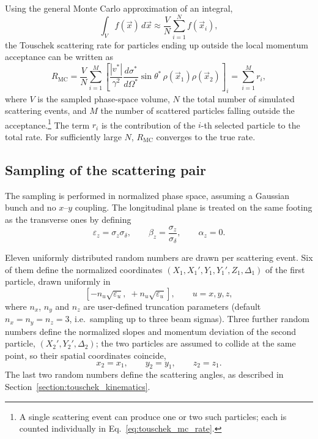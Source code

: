 Using the general Monte Carlo approximation of an integral,
\begin{equation}
    \int_V f(\vec{x})\, d\vec{x} \approx \frac{V}{N} \sum_{i=1}^{N} f(\vec{x}_i) ,
    \label{eq:touschek_mc_integral}
\end{equation}
the Touschek scattering rate for particles ending up outside the local momentum
acceptance can be written as
\begin{equation}
    R_{\mathrm{MC}} = \frac{V}{N} \sum_{i=1}^{M}
    \left[ \frac{|v^{*}|}{\gamma^{2}} \frac{d\sigma^{*}}{d\Omega^{*}}
    \sin\theta^{*}\, \rho(\vec{x}_1) \rho(\vec{x}_2) \right]_i
    = \sum_{i=1}^{M} r_i ,
    \label{eq:touschek_mc_rate}
\end{equation}
where $V$ is the sampled phase-space volume, $N$ the total number of simulated
scattering events, and $M$ the number of scattered particles falling outside the
acceptance.\footnote{A single scattering event can produce one or two such
particles; each is counted individually in Eq.~\eqref{eq:touschek_mc_rate}.} The
term $r_i$ is the contribution of the $i$-th selected particle to the total rate.
For sufficiently large $N$, $R_{\mathrm{MC}}$ converges to the true rate.

\subsection{Sampling of the scattering pair}
\label{section:touschek_sampling}

The sampling is performed in normalized phase space, assuming a Gaussian bunch
and no $x$--$y$ coupling. The longitudinal plane is treated on the same footing
as the transverse ones by defining
\begin{equation}
    \varepsilon_z = \sigma_z \sigma_\delta ,
    \qquad
    \beta_z = \frac{\sigma_z}{\sigma_\delta} ,
    \qquad
    \alpha_z = 0 .
    \label{eq:touschek_long_optics}
\end{equation}

Eleven uniformly distributed random numbers are drawn per scattering event.
Six of them
define the normalized coordinates
$(X_1, X_1', Y_1, Y_1', Z_1, \Delta_1)$ of the first particle, drawn uniformly
in
\begin{equation}
    \left[ -n_u \sqrt{\varepsilon_u},\; +n_u \sqrt{\varepsilon_u} \right] ,
    \qquad u = x, y, z ,
    \label{eq:touschek_sampling_range}
\end{equation}
where $n_x$, $n_y$ and $n_z$ are user-defined truncation parameters (default
$n_x = n_y = n_z = 3$, i.e.\ sampling up to three beam sigmas). Three further
random numbers define the normalized slopes and momentum deviation of the second
particle, $(X_2', Y_2', \Delta_2)$; the two particles are assumed to collide at
the same point, so their spatial coordinates coincide,
\begin{equation}
    x_2 = x_1 , \qquad y_2 = y_1 , \qquad z_2 = z_1 .
    \label{eq:touschek_same_point}
\end{equation}
The last two random numbers define the scattering angles, as described
in Section~\ref{section:touschek_kinematics}.

